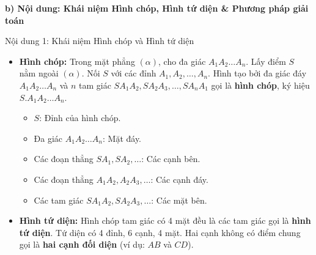 \documentclass[12pt, a4paper]{article}
\begin{document}
\noindent \textbf{b) Nội dung: Khái niệm Hình chóp, Hình tứ diện \& Phương pháp giải toán}
\begin{pedabox}{Nội dung 1: Khái niệm Hình chóp và Hình tứ diện}
\begin{itemize}[leftmargin=0.6cm]
    \item \textbf{Hình chóp:} Trong mặt phẳng $(\alpha)$, cho đa giác $A_1A_2\dots A_n$. Lấy điểm $S$ nằm ngoài $(\alpha)$. Nối $S$ với các đỉnh $A_1, A_2, \dots, A_n$. Hình tạo bởi đa giác đáy $A_1A_2\dots A_n$ và $n$ tam giác $SA_1A_2, SA_2A_3, \dots, SA_nA_1$ gọi là \textbf{hình chóp}, ký hiệu $S.A_1A_2\dots A_n$.
    \begin{itemize}
        \item $S$: Đỉnh của hình chóp.
        \item Đa giác $A_1A_2\dots A_n$: Mặt đáy.
        \item Các đoạn thẳng $SA_1, SA_2, \dots$: Các cạnh bên.
        \item Các đoạn thẳng $A_1A_2, A_2A_3, \dots$: Các cạnh đáy.
        \item Các tam giác $SA_1A_2, SA_2A_3, \dots$: Các mặt bên.
    \end{itemize}
    \item \textbf{Hình tứ diện:} Hình chóp tam giác có 4 mặt đều là các tam giác gọi là \textbf{hình tứ diện}. Tứ diện có 4 đỉnh, 6 cạnh, 4 mặt. Hai cạnh không có điểm chung gọi là \textbf{hai cạnh đối diện} (ví dụ: $AB$ và $CD$).
\end{itemize}
\end{pedabox}
\end{document}
